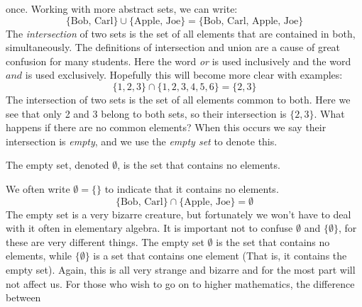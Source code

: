 \documentclass[crop=false,class=book,oneside]{standalone}
\begin{document}
            once. Working with more abstract sets, we can write:
            \begin{equation}
                \{\textrm{Bob, Carl}\}\cup\{\textrm{Apple, Joe}\}
                =\{\textrm{Bob, Carl, Apple, Joe}\}
            \end{equation}
            The \textit{intersection} of two sets is the set of all
            elements that are contained in both, simultaneously.
            The definitions of intersection and union are a cause
            of great confusion for many students. Here the word
            \textit{or} is used inclusively and the word
            $\textit{and}$ is used exclusively. Hopefully this will
            become more clear with examples:
            \begin{equation}
                \{1,2,3\}\cap\{1,2,3,4,5,6\}
                =\{2,3\}
            \end{equation}
            The intersection of two sets is the set of
            all elements common to both. Here we see that only
            2 and 3 belong to both sets, so their intersection is
            $\{2,3\}$. What happens if there are no common elements?
            When this occurs we say their intersection is
            \textit{empty}, and we use the \textit{empty set}
            to denote this.
            \begin{definition}
                The empty set, denoted $\emptyset$, is the set
                that contains no elements.
            \end{definition}
            We often write $\emptyset=\{\}$ to indicate that
            it contains no elements.
            \begin{equation}
                \{\textrm{Bob, Carl}\}\cap\{\textrm{Apple, Joe}\}
                =\emptyset
            \end{equation}
            The empty set is a very bizarre creature, but
            fortunately we won't have to deal with it
            often in elementary algebra. It is important not
            to confuse $\emptyset$ and $\{\emptyset\}$, for these
            are very different things. The empty set
            $\emptyset$ is the set that contains no elements,
            while $\{\emptyset\}$ is a set that contains one
            element (That is, it contains the empty set). Again, 
            this is all very strange and bizarre and for the most
            part will not affect us. For those who wish to go on
            to higher mathematics, the difference between
\end{document}
